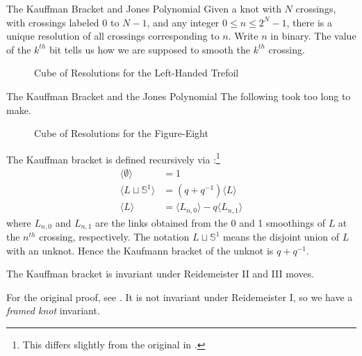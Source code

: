 \documentclass{beamer}
\begin{document}
    \begin{frame}{The Kauffman Bracket and Jones Polynomial}
        Given a knot with $N$ crossings, with crossings labeled 0 to $N-1$,
        and any integer $0\leq{n}\leq{2}^{N}-1$, there is a unique resolution of
        all crossings corresponding to $n$. Write $n$ in binary. The value of
        the $k^{th}$ bit tells us how we are supposed to smooth the $k^{th}$
        crossing.
        \begin{figure}
            \centering
            \caption{Cube of Resolutions for the Left-Handed Trefoil}
            \label{fig:trefoil_knot_cube_of_resolutions}
        \end{figure}
    \end{frame}
    \begin{frame}{The Kauffman Bracket and the Jones Polynomial}
        The following took too long to make.
        \begin{figure}
            \centering
            \caption{Cube of Resolutions for the Figure-Eight}
            \label{fig:figure_eight_knot_cube_of_resolutions}
        \end{figure}
    \end{frame}
    \begin{frame}
        The Kauffman bracket is defined recursively via
        \cite[p.~338-339]{BarNatanKhovanovJones}:\footnote{%
            This differs slightly from the original in
            \cite[p.~396]{KauffmanStateModels}.
        }
        \begin{align}
            \langle\emptyset\rangle&=1\\
            \langle{L\sqcup\mathbb{S}^{1}}\rangle&=(q+q^{-1})\langle{L}\rangle\\
            \langle{L}\rangle&=
                \langle{L_{n,0}}\rangle-q\langle{L_{n,1}}\rangle
        \end{align}
        where $L_{n,0}$ and $L_{n,1}$ are the links obtained from the
        0 and 1 smoothings of $L$ at the $n^{th}$ crossing, respectively. The
        notation $L\sqcup\mathbb{S}^{1}$ means the disjoint union of
        $L$ with an unknot. Hence the Kaufmann bracket of the
        unknot is $q+q^{-1}$.
        \begin{theorem}
            The Kauffman bracket is invariant under Reidemeister II and III
            moves.
        \end{theorem}
        For the original proof, see \cite[p.~397-398]{KauffmanStateModels}.
        It is not invariant under Reidemeister I, so we have a
        \textit{framed knot} invariant.
    \end{frame}
\end{document}
